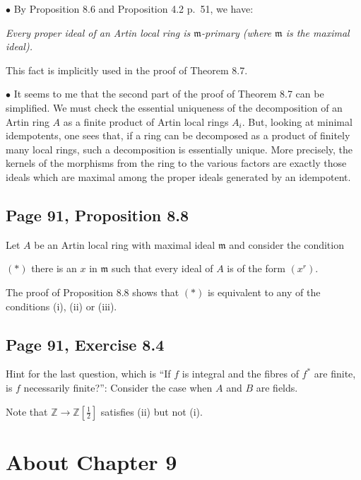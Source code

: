 \documentclass[parskip=half,fontsize=12pt]{scrartcl}%
\newcommand{\mf}{\mathfrak}
\newcommand{\bu}{\bullet}
\begin{document}
$\bu$ By Proposition 8.6 and Proposition 4.2 p.~51, we have:

\emph{Every proper ideal of an Artin local ring is $\mf m$-primary (where $\mf m$ is the maximal ideal).} 

This fact is implicitly used in the proof of Theorem 8.7.

$\bu$ It seems to me that the second part of the proof of Theorem 8.7 can be simplified. We must check the essential uniqueness of the decomposition of an Artin ring $A$ as a finite product of Artin local rings $A_i$. But, looking at minimal idempotents, one sees that, if a ring can be decomposed as a product of finitely many local rings, such a decomposition is essentially unique. More precisely, the kernels of the morphisms from the ring to the various factors are exactly those ideals which are maximal among the proper ideals generated by an idempotent. %

\subsection{Page 91, Proposition 8.8}\label{88}%

Let $A$ be an Artin local ring with maximal ideal $\mf m$ and consider the condition

$(*)$ there is an $x$ in $\mf m$ such that every ideal of $A$ is of the form $(x^r)$. 

The proof of Proposition 8.8 shows that $(*)$ is equivalent to any of the conditions (i), (ii) or (iii). 

\subsection{Page 91, Exercise 8.4}%

Hint for the last question, which is ``If $f$ is integral and the fibres of $f^*$ are finite, is $f$ necessarily finite?'': Consider the case when $A$ and $B$ are fields. 

Note that $\mathbb Z\to\mathbb Z[\frac12]$ satisfies (ii) but not (i). 

\section{About Chapter 9}%
\end{document}
